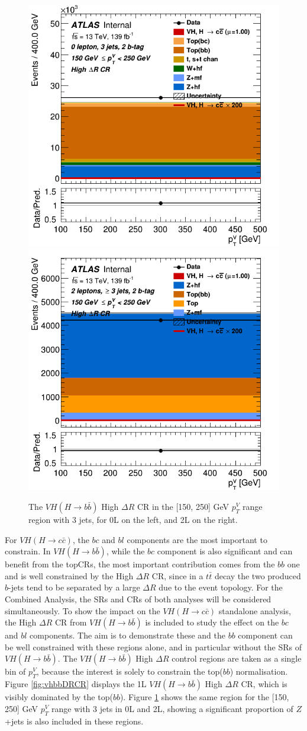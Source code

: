 \begin{figure}[h!]
\center
\includegraphics[width=0.48\textwidth25]{Images/VH/SRsandTopCRs/Region_distpTV_DCRHigh_BMax250_L0_Y6051_TTypebb_T2_J3_BMin150_Prefit.png}
\includegraphics[width=0.48\textwidth25]{Images/VH/SRsandTopCRs/Region_distpTV_DCRHigh_BMax250_BMin150_Y6051_TTypebb_T2_J3_L2_incJet1_Prefit.png}
\caption{The $VH(H\rightarrow b\bar{b})$ High $\Delta R$ CR in the [150, 250] GeV $p_T^V$ range region with 3 jets, for 0L on the left, and 2L on the right.} 
\label{fig:vhbbDRCR02L}
\end{figure}

For $VH(H\rightarrow c\bar{c})$, the $bc$ and $bl$ components are the most important to constrain. In $VH(H\rightarrow b\bar{b})$, while the $bc$ component is also significant and can benefit from the topCRs, the most important contribution comes from the $bb$ one and is well constrained by the High $\Delta R$ CR, since in a $t\bar{t}$ decay the two produced $b$-jets tend to be separated by a large $\Delta R$ due to the event topology. For the Combined Analysis, the SRs and CRs of both analyses will be considered simultaneously. To show the impact on the $VH(H\rightarrow c\bar{c})$ standalone analysis, the High $\Delta R$ CR from  $VH(H\rightarrow b\bar{b})$ is included to study the effect on the $bc$ and $bl$ components. The aim is to demonstrate these and the $bb$ component can be well constrained with these regions alone, and in particular without the SRs of $VH(H\rightarrow b\bar{b})$. The $VH(H\rightarrow b\bar{b})$ High $\Delta R$ control regions are taken as a single bin of $p_T^V$, because the interest is solely to constrain the top($bb$) normalisation. Figure \ref{fig:vhbbDRCR} displays the 1L $VH(H\rightarrow b\bar{b})$ High $\Delta R$ CR, which is visibly dominated by the top($bb$). Figure \ref{fig:vhbbDRCR02L} shows the same region for the [150, 250] GeV $p_T^V$ range with 3 jets in 0L and 2L, showing a significant proportion of $Z$+jets is also included in these regions.  \\
